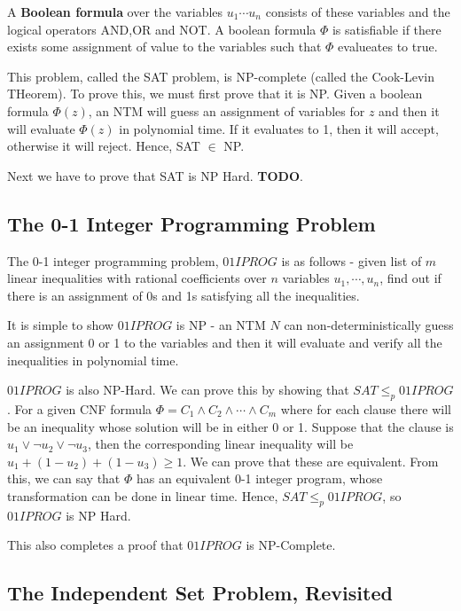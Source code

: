 \documentclass[12pt,letterpaper]{article}
\theoremstyle{definition}
\begin{document}
A \textbf{Boolean formula}  over the variables $u_1 \cdots u_n$ consists of these variables and the logical operators AND,OR and NOT. A boolean formula $\Phi$ is satisfiable if there exists some assignment of value to the variables such that $\Phi$ evalueates to true.

This problem, called the SAT problem, is NP-complete (called the Cook-Levin THeorem). To prove this, we must first prove that it is NP. Given a boolean formula $\Phi(z)$, an NTM will guess an assignment of variables for $z$ and then it will evaluate $\Phi(z)$ in polynomial time. If it evaluates to 1, then it will accept, otherwise it will reject. Hence, SAT $\in$ NP.

Next we have to prove that SAT is NP Hard. \textbf{TODO}.

\subsection{The 0-1 Integer Programming Problem}

The 0-1 integer programming problem, $01IPROG$ is as follows - given  list of $m$ linear inequalities with rational coefficients over $n$ variables $u_1, \cdots, u_n$, find out if there is an assignment of 0s and 1s satisfying all the inequalities.

It is simple to show $01IPROG$ is NP - an NTM $N$ can non-deterministically guess an assignment 0 or 1 to the variables and then it will evaluate and verify all the inequalities in polynomial time.

$01IPROG$ is also NP-Hard. We can prove this by showing that $SAT \leq_p 01IPROG$. For a given CNF formula $\Phi = C_1 \land C_2 \land \cdots \land C_m$ where for each clause there will be an inequality whose solution will be in either 0 or 1. Suppose that the clause is $u_1 \lor \lnot u_2 \lor \lnot u_3$, then the corresponding linear inequality will be $u_1 + (1 - u_2) + (1-u_3) \geq 1$. We can prove that these are equivalent. From this, we can say that $\Phi$ has an equivalent 0-1 integer program, whose transformation can be done in linear time. Hence, $SAT \leq_p 01IPROG$, so $01IPROG$ is NP Hard.

This also completes a proof that $01IPROG$ is NP-Complete.

\subsection{The Independent Set Problem, Revisited}
\end{document}
